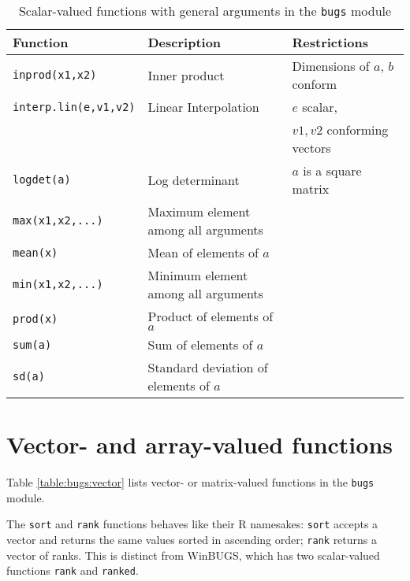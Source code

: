 \documentclass[11pt, a4paper, titlepage]{report}
\newcommand{\WinBUGS}{\textsf{WinBUGS}}
\begin{document}
\begin{table}
\begin{tabular}{lll}
\hline
Function & Description & Restrictions \\
\hline
\verb+inprod(x1,x2)+ & Inner product & Dimensions of $a$, $b$ conform \\
\verb+interp.lin(e,v1,v2)+ & Linear Interpolation & $e$ scalar, \\
                          &                     & $v1,v2$ conforming vectors \\
\verb+logdet(a)+ & Log determinant & $a$ is a square matrix \\
\verb+max(x1,x2,...)+ & Maximum element among all arguments & \\
\verb+mean(x)+  & Mean of elements of $a$ & \\
\verb+min(x1,x2,...)+ & Minimum element among all arguments & \\
\verb+prod(x)+  & Product of elements of $a$ & \\
\verb+sum(a)+   & Sum of elements of $a$& \\
\verb+sd(a)+    & Standard deviation of elements of $a$ & \\
\hline
\end{tabular}
\caption{Scalar-valued functions with general
  arguments in the \texttt{bugs} module \label{table:bugs:scalar2}}
\end{table}

\section{Vector- and array-valued functions}

Table \ref{table:bugs:vector} lists vector- or matrix-valued functions
in the \texttt{bugs} module.

The \texttt{sort} and \texttt{rank} functions behaves like their R
namesakes: \texttt{sort} accepts a vector and returns the same values
sorted in ascending order; \texttt{rank} returns a vector of ranks.
This is distinct from \WinBUGS, which has two scalar-valued functions
\verb+rank+ and \verb+ranked+.
\end{document}
